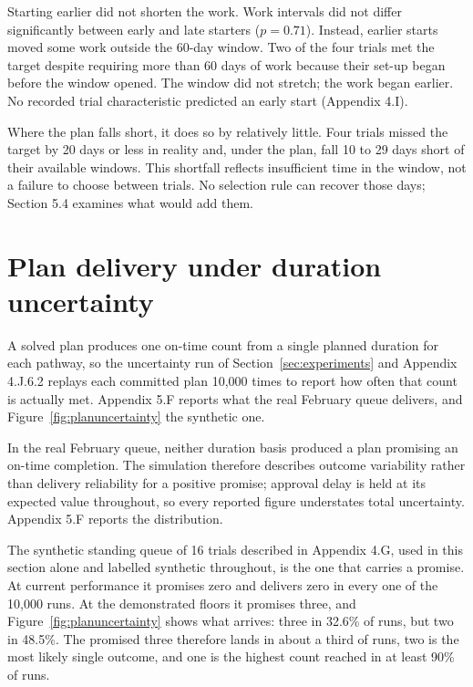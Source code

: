 Starting earlier did not shorten the work. Work intervals did not differ significantly between early and late starters ($p = 0.71$). Instead, earlier starts moved some work outside the 60-day window. Two of the four trials met the target despite requiring more than 60 days of work because their set-up began before the window opened. The window did not stretch; the work began earlier. No recorded trial characteristic predicted an early start (Appendix 4.I).

Where the plan falls short, it does so by relatively little. Four trials missed the target by 20 days or less in reality and, under the plan, fall 10 to 29 days short of their available windows. This shortfall reflects insufficient time in the window, not a failure to choose between trials. No selection rule can recover those days; Section 5.4 examines what would add them.

\section{Plan delivery under duration uncertainty}
\label{sec:delivery}

A solved plan produces one on-time count from a single planned duration for each pathway, so the uncertainty run of Section~\ref{sec:experiments} and Appendix 4.J.6.2 replays each committed plan 10,000 times to report how often that count is actually met. Appendix 5.F reports what the real February queue delivers, and Figure~\ref{fig:planuncertainty} the synthetic one.

In the real February queue, neither duration basis produced a plan promising an on-time completion. The simulation therefore describes outcome variability rather than delivery reliability for a positive promise; approval delay is held at its expected value throughout, so every reported figure understates total uncertainty. Appendix 5.F reports the distribution.

The synthetic standing queue of 16 trials described in Appendix 4.G, used in this section alone and labelled synthetic throughout, is the one that carries a promise. At current performance it promises zero and delivers zero in every one of the 10,000 runs. At the demonstrated floors it promises three, and Figure~\ref{fig:planuncertainty} shows what arrives: three in 32.6\% of runs, but two in 48.5\%. The promised three therefore lands in about a third of runs, two is the most likely single outcome, and one is the highest count reached in at least 90\% of runs.

